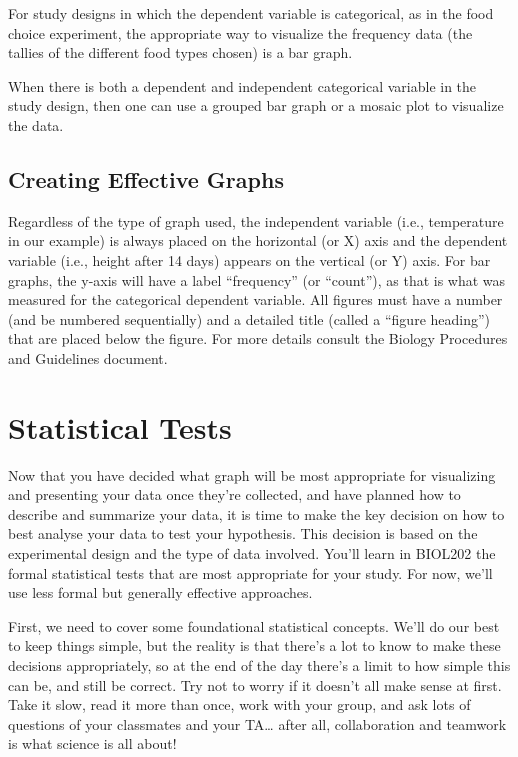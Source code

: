 \documentclass[
]{book}
\begin{document}
For study designs in which the dependent variable is categorical, as in the food choice experiment, the appropriate way to visualize the frequency data (the tallies of the different food types chosen) is a bar graph.

When there is both a dependent and independent categorical variable in the study design, then one can use a grouped bar graph or a mosaic plot to visualize the data.

\hypertarget{creating-effective-graphs}{%
\subsection*{Creating Effective Graphs}\label{creating-effective-graphs}}

Regardless of the type of graph used, the independent variable (i.e., temperature in our example) is always placed on the horizontal (or X) axis and the dependent variable (i.e., height after 14 days) appears on the vertical (or Y) axis. For bar graphs, the y-axis will have a label ``frequency'' (or ``count''), as that is what was measured for the categorical dependent variable. All figures must have a number (and be numbered sequentially) and a detailed title (called a ``figure heading'') that are placed below the figure. For more details consult the Biology Procedures and Guidelines document.

\hypertarget{statistical-tests}{%
\section*{Statistical Tests}\label{statistical-tests}}

Now that you have decided what graph will be most appropriate for visualizing and presenting your data once they're collected, and have planned how to describe and summarize your data, it is time to make the key decision on how to best analyse your data to test your hypothesis. This decision is based on the experimental design and the type of data involved. You'll learn in BIOL202 the formal statistical tests that are most appropriate for your study. For now, we'll use less formal but generally effective approaches.

First, we need to cover some foundational statistical concepts. We'll do our best to keep things simple, but the reality is that there's a lot to know to make these decisions appropriately, so at the end of the day there's a limit to how simple this can be, and still be correct. Try not to worry if it doesn't all make sense at first. Take it slow, read it more than once, work with your group, and ask lots of questions of your classmates and your TA\ldots{} after all, collaboration and teamwork is what science is all about!
\end{document}
